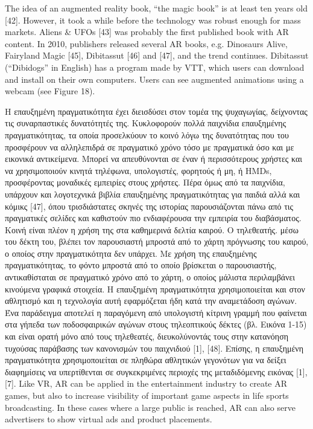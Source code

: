 The idea of an augmented reality book, “the magic book” is at least ten years old [42]. However, it took a while before the technology was robust enough for mass markets. Aliens \& UFOs [43] was probably the first published book with AR content. In 2010, publishers released several AR books, e.g. Dinosaurs Alive\! [44], Fairyland Magic [45], Dibitassut [46] and [47], and the trend continues. Dibitassut (“Dibidogs” in English) has a program made by VTT, which users can download and install on their own computers. Users can see augmented animations using a webcam (see Figure 18).




Η επαυξημένη πραγματικότητα έχει διεισδύσει στον τομέα της ψυχαγωγίας, δείχνοντας τις συναρπαστικές δυνατότητές της. Κυκλοφορούν πολλά παιχνίδια επαυξημένης πραγματικότητας, τα οποία προσελκύουν το κοινό λόγω της δυνατότητας που του προσφέρουν να αλληλεπιδρά σε πραγματικό χρόνο τόσο με πραγματικά όσο και με εικονικά αντικείμενα. Μπορεί να απευθύνονται σε έναν ή περισσότερους χρήστες και να χρησιμοποιούν κινητά τηλέφωνα, υπολογιστές, φορητούς ή μη, ή ΗΜDs, προσφέροντας μοναδικές εμπειρίες στους χρήστες. Πέρα όμως από τα παιχνίδια, υπάρχουν και λογοτεχνικά βιβλία επαυξημένης πραγματικότητας για παιδιά αλλά και κόμικς [47], όπου τρισδιάστατες σκηνές της ιστορίας παρουσιάζονται πάνω από τις πραγματικές σελίδες και καθιστούν πιο ενδιαφέρουσα την εμπειρία του διαβάσματος. Κοινή είναι πλέον η χρήση της στα καθημερινά δελτία καιρού. Ο τηλεθεατής. μέσω του δέκτη του, βλέπει τον παρουσιαστή μπροστά από το χάρτη πρόγνωσης του καιρού, ο οποίος στην πραγματικότητα δεν υπάρχει. Με χρήση της επαυξημένης πραγματικότητας, το φόντο μπροστά από το οποίο βρίσκεται ο παρουσιαστής, αντικαθίσταται σε πραγματικό χρόνο από το χάρτη, ο οποίος μάλιστα περιλαμβάνει κινούμενα γραφικά στοιχεία. Η επαυξημένη πραγματικότητα χρησιμοποιείται και στον αθλητισμό και η τεχνολογία αυτή εφαρμόζεται ήδη κατά την αναμετάδοση αγώνων. Ένα παράδειγμα αποτελεί η παραγόμενη από υπολογιστή κίτρινη γραμμή που φαίνεται στα γήπεδα των ποδοσφαιρικών αγώνων στους τηλεοπτικούς δέκτες (βλ. Εικόνα 1-15) και είναι ορατή μόνο από τους τηλεθεατές, διευκολύνοντάς τους στην κατανόηση τυχούσας παράβασης των κανονισμών του παιχνιδιού [1], [48]. Επίσης, η επαυξημένη πραγματικότητα χρησιμοποιείται σε πληθώρα αθλητικών γεγονότων για να δείξει διαφημίσεις να υπερτίθενται σε συγκεκριμένες περιοχές της μεταδιδόμενης εικόνας [1], [7].
Like VR, AR can be applied in the entertainment industry to
create AR games, but also to increase visibility of important
game aspects in life sports broadcasting. In these cases where
a large public is reached, AR can also serve advertisers to
show virtual ads and product placements.

